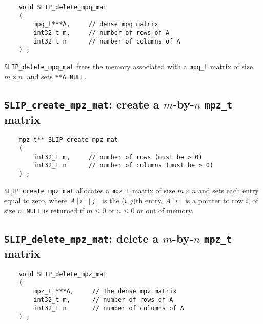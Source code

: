 \documentclass[12pt]{article}
\theoremstyle{definition}
\begin{document}
\begin{mdframed}[userdefinedwidth=6in]
{\footnotesize
\begin{verbatim}
    void SLIP_delete_mpq_mat
    (
        mpq_t***A,     // dense mpq matrix
        int32_t m,     // number of rows of A
        int32_t n      // number of columns of A
    ) ;
\end{verbatim}
} \end{mdframed}


\verb|SLIP_delete_mpq_mat| frees the memory associated with a \verb|mpq_t|
matrix of size $m \times n$, and sets \verb|**A=NULL|.

\cprotect\subsection{\verb|SLIP_create_mpz_mat|: create a $m$-by-$n$ \verb|mpz_t| matrix}

\begin{mdframed}[userdefinedwidth=6in]
{\footnotesize
\begin{verbatim}
    mpz_t** SLIP_create_mpz_mat
    (
        int32_t m,     // number of rows (must be > 0)
        int32_t n      // number of columns (must be > 0)
    ) ;
\end{verbatim}
} \end{mdframed}

\verb|SLIP_create_mpz_mat| allocates a \verb|mpz_t| matrix of size $m \times n$
and sets each entry equal to zero, where $A[i][j]$ is the ($i,j$)th entry.
$A[i]$ is a pointer to row $i$, of size $n$. \verb|NULL| is returned if
$m \le 0 $ or $n\le 0$ or out of memory.


\cprotect\subsection{\verb|SLIP_delete_mpz_mat|: delete a $m$-by-$n$ \verb|mpz_t| matrix}

\begin{mdframed}[userdefinedwidth=6in]
{\footnotesize
\begin{verbatim}
    void SLIP_delete_mpz_mat
    (
        mpz_t ***A,     // The dense mpz matrix
        int32_t m,      // number of rows of A
        int32_t n       // number of columns of A
    ) ;
\end{verbatim}
} \end{mdframed}
\end{document}
